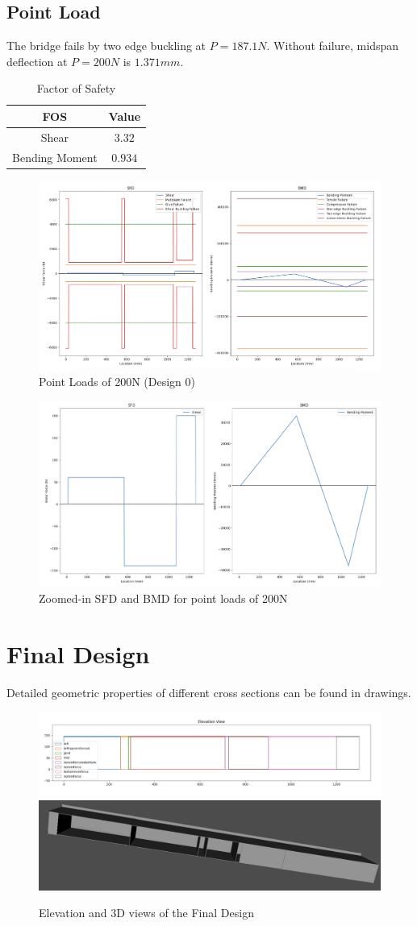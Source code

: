 \documentclass[11pt,twocolumn,letterpaper]{article}
\begin{document}
\subsection*{Point Load}
The bridge fails by two edge buckling at $P = 187.1\si{N}$. Without failure, midspan deflection at $P = 200\si{N}$ is $1.371\si{mm}$.
\begin{table}[h]
\begin{center}
\begin{tabular}{|cc|} 
\hline
\multicolumn{1}{|c}{FOS} & \multicolumn{1}{c|}{Value} \\
\hline
Shear &   $3.32$ \\
Bending Moment &   $0.934$ \\
\hline
\end{tabular}
\caption{Factor of Safety}
\end{center}
\end{table}


\begin{figure}[h!]
  \centering
    \includegraphics[width=.38\textwidth]{figures/SBPointDesign0.png}
    \caption {Point Loads of 200N (Design 0)}
  \hfill
\end{figure}


\begin{figure}[h!]
  \centering
    \includegraphics[width=.38\textwidth]{figures/CleanSBPointDesign0.png}
    \caption {Zoomed-in SFD and BMD for point loads of 200N}
  \hfill
\end{figure}

\section*{Final Design}

Detailed geometric properties of different cross sections can be found in drawings. 
\begin{figure}[h!]
  \centering
    \includegraphics[width=.4\textwidth]{figures/elevationview.png}
    \vspace{1em}
    \includegraphics[width=.4\textwidth]{figures/3d bottom view.png}
    \caption {Elevation and 3D views of the Final Design}
  \hfill
\end{figure}
\end{document}
